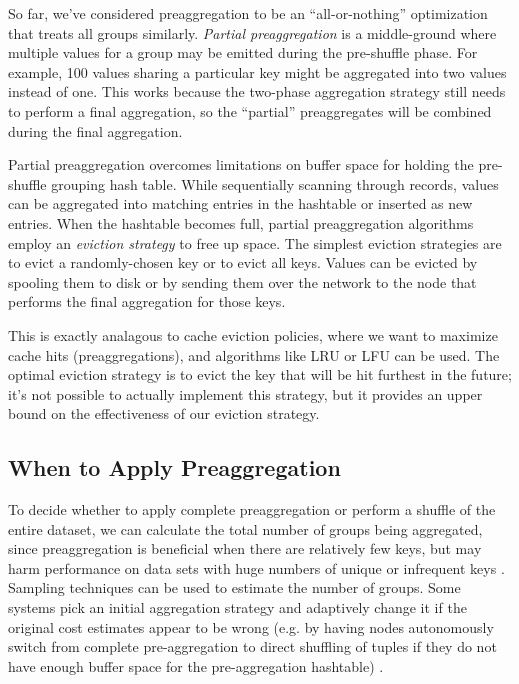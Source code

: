 \documentclass[12pt]{article}
\begin{document}
So far, we've considered preaggregation to be an ``all-or-nothing'' optimization that treats all groups similarly.
\emph{Partial preaggregation} \cite{partial-preaggregation} is a middle-ground where multiple values for a group may be emitted during the pre-shuffle phase.  For example, 100 values sharing a particular key might be aggregated into two values instead of one.
This works because the two-phase aggregation strategy still needs to perform a final aggregation, so the ``partial'' preaggregates will be combined during the final aggregation.

Partial preaggregation overcomes limitations on buffer space for holding the pre-shuffle grouping hash table.
While sequentially scanning through records, values can be aggregated into matching entries in the hashtable or inserted as new entries.
When the hashtable becomes full, partial preaggregation algorithms employ an \emph{eviction strategy} to free up space.
The simplest eviction strategies are to evict a randomly-chosen key or to evict all keys.
Values can be evicted by spooling them to disk or by sending them over the network to the node that performs the final aggregation for those keys.

This is exactly analagous to cache eviction policies, where we want to maximize cache hits (preaggregations), and algorithms like LRU or LFU can be used.
The optimal eviction strategy is to evict the key that will be hit furthest in the future; it's not possible to actually implement this strategy, but it provides an upper bound on the effectiveness of our eviction strategy.



\subsection{When to Apply Preaggregation}

To decide whether to apply complete preaggregation or perform a shuffle of the entire dataset, we can calculate the total number of groups being aggregated, since preaggregation is beneficial when there are relatively few keys, but may harm performance on data sets with huge numbers of unique or infrequent keys \cite{adaptive-aggregation}.
Sampling techniques can be used to estimate the number of groups.
Some systems pick an initial aggregation strategy and adaptively change it if the original cost estimates appear to be wrong (e.g. by having nodes autonomously switch from complete pre-aggregation to direct shuffling of tuples if they do not have enough buffer space for the pre-aggregation hashtable) \cite{adaptive-aggregation}.
\end{document}
